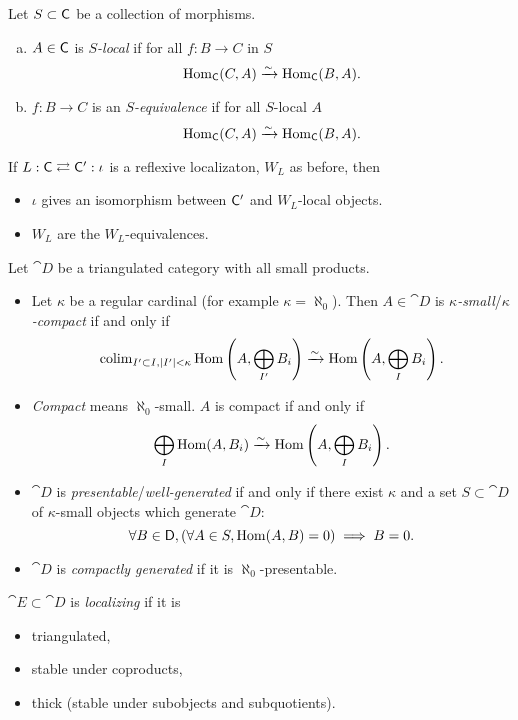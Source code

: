 \begin{definition}
	Let $S\subset \mathsf{C}$ be a collection of morphisms.
	\begin{enumerate}[a)]
		\item $A\in \mathsf{C}$ is \emph{$S$-local} if for all $f:B\to C$ in $S$ 
			\[
			\operatorname{Hom}_\mathsf{C}(C,A) \xrightarrow{\sim} \operatorname{Hom}_\mathsf{C}(B,A).
			\] 
		\item $f:B\to C$ is an \emph{$S$-equivalence} if for all $S$-local $A$ 
			\[
			\operatorname{Hom}_{\mathsf{C}}(C,A) \xrightarrow{\sim} \operatorname{Hom}_\mathsf{C}(B,A).
			\] 
	\end{enumerate}
\end{definition}
\begin{lemma}
	If $L:\mathsf{C} \rightleftarrows \mathsf{C}':\iota$ is a reflexive localizaton, $W_L$ as before, then
	\begin{itemize}
		\item $\iota$ gives an isomorphism between $\mathsf{C}'$ and $W_L$-local objects.
		\item $W_L$ are the $W_L$-equivalences.
	\end{itemize}
\end{lemma}
\begin{definition}
	Let $\cat{D}$ be a triangulated category with all small products.
	\begin{itemize}
		\item Let $\kappa$ be a regular  cardinal (for example $\kappa=\aleph_0$). Then $A\in \cat{D}$ is \emph{$\kappa$-small}/\emph{$\kappa$-compact} if and only if
			\[
			\operatorname{colim}_{I' \subset I, |I'|<\kappa} \operatorname{Hom}\left( A,\bigoplus_{I'}B_i \right) \xrightarrow{\sim} \operatorname{Hom}\left( A, \bigoplus_I B_i \right) 
			.\] 
		\item \emph{Compact} means $\aleph_0$-small. $A$ is compact if and only if
			\[
			\bigoplus_I \operatorname{Hom}(A,B_i) \xrightarrow{\sim} \operatorname{Hom} \left( A,\bigoplus_{I}B_i \right) 
			.\] 
		\item $\cat{D}$ is \emph{presentable}/\emph{well-generated} if and only if there exist $\kappa$ and a set $S\subset \cat{D}$ of $\kappa$-small objects which generate $\cat{D}$:
			\[
				\forall B\in \mathsf{D},\left( \forall A\in S, \operatorname{Hom}(A,B)=0 \right) \implies B = 0
			.\] 
		\item $\cat{D}$ is \emph{compactly generated} if it is $\aleph_0$-presentable.
	\end{itemize}
\end{definition}

\begin{definition}
	$\cat{E}\subset \cat{D}$ is \emph{localizing} if it is
	\begin{itemize}
		\item triangulated,
		\item stable under coproducts,
		\item thick (stable under subobjects and subquotients).
	\end{itemize}
\end{definition}

